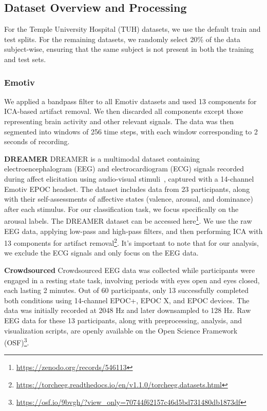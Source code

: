 \documentclass{article} %
\begin{document}
\subsection{Dataset Overview and Processing} \label{app:data}
For the Temple University Hospital (TUH) datasets, we use the default train and test splits. For the remaining datasets, we randomly select 20\% of the data subject-wise, ensuring that the same subject is not present in both the training and test sets.

\subsubsection{\textbf{Emotiv}}
We applied a bandpass filter to all Emotiv datasets and used 13 components for ICA-based artifact removal. We then discarded all components except those representing brain activity and other relevant signals. The data was then segmented into windows of 256 time steps, with each window corresponding to 2 seconds of recording.

\noindent\textbf{DREAMER}
DREAMER is a multimodal dataset containing electroencephalogram (EEG) and electrocardiogram (ECG) signals recorded during affect elicitation using audio-visual stimuli~\citep{dreamer}, captured with a 14-channel Emotiv EPOC headset. The dataset includes data from 23 participants, along with their self-assessments of affective states (valence, arousal, and dominance) after each stimulus. For our classification task, we focus specifically on the arousal labels. The DREAMER dataset can be accessed here\footnote{\url{https://zenodo.org/records/546113}}. We use the raw EEG data, applying low-pass and high-pass filters, and then performing ICA with 13 components for artifact removal\footnote{\url{https://torcheeg.readthedocs.io/en/v1.1.0/torcheeg.datasets.html}}. It’s important to note that for our analysis, we exclude the ECG signals and only focus on the EEG data.


\noindent\textbf{Crowdsourced}
Crowdsourced EEG data was collected while participants were engaged in a resting state task, involving periods with eyes open and eyes closed, each lasting 2 minutes. Out of 60 participants, only 13 successfully completed both conditions using 14-channel EPOC+, EPOC X, and EPOC devices. The data was initially recorded at 2048 Hz and later downsampled to 128 Hz. Raw EEG data for these 13 participants, along with preprocessing, analysis, and visualization scripts, are openly available on the Open Science Framework (OSF)\footnote{\url{https://osf.io/9bvgh/?view_only=70744f62157c46d5bd731480db1873df}}.
\end{document}
